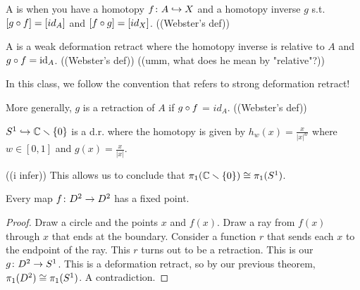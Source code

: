 \documentclass[11pt,leqno,oneside]{amsart}
\newenvironment{dateenv}{
  \vspace{1em}
}{
  \vspace{1em}
}
\newcommand{\mydate}[4]{
  \newdate{#1}{#2}{#3}{#4}
  \begin{dateenv}
    \hfill\displaydate{#1}
  \end{dateenv}
}
\numberwithin{thm}{section}
\newcommand{\minus}{\smallsetminus}
\newcommand{\fund}{\pi_1}
\newcommand{\id}{\text{id}}
\begin{document}
\begin{defn}
  A  is when you have a homotopy $f\colon A \hookrightarrow X$ and a homotopy inverse $g$ s.t. $[g \circ f] = [id_A]$ and $[f \circ g] = [id_X]$. ((Webster's def))
\end{defn}
\begin{defn}
  A  is a weak deformation retract where the homotopy inverse is relative to $A$ and $g \of f = \id_A$. ((Webster's def)) ((umm, what does he mean by "relative"?))
\end{defn}
In this class, we follow the convention that  refers to strong deformation retract!
\begin{rmk}
  More generally, $g$ is a retraction of $A$ if $g \circ f$ = $id_A$. ((Webster's def))
\end{rmk}
\begin{example}
  $S^1 \into \C\minus\{0\}$ is a d.r. where the homotopy is given by $h_w(x) = \frac{x}{|x|^w}$ where $w \in [0,1]$  and $g(x) = \frac{x}{|x|}$.

  ((i infer)) This allows us to conclude that $\fund(\C\minus\{0\}) \isom \fund(S^1)$.
\end{example}
\begin{thm}
  Every map $f\colon D^2 \to D^2$ has a fixed point.
\end{thm}



\begin{proof}
  Draw a circle and the points $x$ and $f(x)$.  Draw a ray from $f(x)$ through $x$ that ends at the boundary.  Consider a function $r$ that sends each $x$ to the endpoint of the ray.  This $r$ turns out to be a retraction.  This is our $g\colon D^2 \to S^1$.  This is a deformation retract, so by our previous theorem, $\fund(D^2) \isom \fund(S^1)$.  A contradiction.
\end{proof}





\mydate{d6}{3}{2}{2017}
\end{document}
